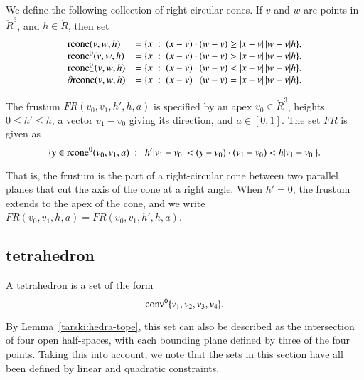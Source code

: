 \begin{definition}
We define the following collection of right-circular cones.
If $v$ and $w$ are points in $\ring{R}^3$, and
  $h\in\ring{R}$, then set
  $$\begin{array}{lll}
    {\operatorname{rcone}}(v,w,h) &= \{x\ :\  (x-v)\cdot (w-v) \ge |x-v|\,|w-v| h\},\\
    {\operatorname{rcone}}^0(v,w,h) &= \{x\ :\  (x-v)\cdot (w-v) > |x-v|\,|w-v| h\}.\\
    {\operatorname{rcone}}_-^0(v,w,h) &= \{x\ :\  (x-v)\cdot (w-v) < |x-v|\,|w-v| h\}.\\
    \partial{\operatorname{rcone}}(v,w,h) &= \{x\ :\  (x-v)\cdot (w-v) = |x-v|\,|w-v| h\}.\\
    \end{array}
    $$
\end{definition}



\begin{definition} The frustum
$FR(v_0,v_1,h',h,a)$ is specified by an apex $v_0\in\ring{R}^3$, heights
$0\le h'\le h$, a vector $v_1-v_0$ giving its direction, and
$a\in[0,1]$. The set $FR$ is given as
    $$
    \{ y \in\op{rcone}^0(v_0,v_1,a) \mid \ 
       h'|v_1-v_0| < (y-v_0) \cdot (v_1-v_0) < h|v_1-v_0| \}.
    $$
\end{definition}

That is, the frustum is the part of a right-circular cone between two
parallel planes that cut the axis of the cone at a right angle.
When $h'=0$, the frustum extends to the apex of the cone, and
we write $FR(v_0,v_1,h,a)=FR(v_0,v_1,h',h,a)$.

\subsection{tetrahedron}

\begin{definition} A tetrahedron is a set of the form
$${\operatorname{conv}}^0\{v_1,v_2,v_3,v_4\}.$$
\end{definition}

By Lemma~\ref{tarski:hedra-tope}, this set can also be described
as the intersection of four open half-spaces, with each bounding
plane defined by three of the four points.
Taking this into account, we note that
the sets in this section have all been defined by linear and quadratic
constraints.


